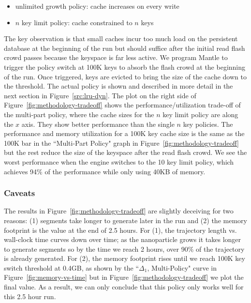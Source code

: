 \begin{itemize}
  \item unlimited growth policy: cache increases on every write
  \item \(n\) key limit policy: cache constrained to \(n\) keys
\end{itemize}

The key observation is that small caches incur too much load on the persistent
database at the beginning of the run but should suffice after the initial read
flash crowd passes because the keyspace is far less active.  We program Mantle
to trigger the policy switch at 100K keys to absorb the flash crowd at the
beginning of the run. Once triggered, keys are evicted to bring the size of the
cache down to the threshold.  The actual policy is shown and described in more
detail in the next section in Figure~\ref{src:lru-dyn}.  The plot on the right
side of Figure~\ref{fig:methodology-tradeoff} shows the performance/utilization
trade-off of the multi-part policy, where the cache sizes for the \(n\) key
limit policy are along the \(x\) axis.  They show better performance than the
single \(n\) key policies. The performance and memory utilization for a 100K
key cache size is the same as the 100K bar in the ``Multi-Part Policy" graph in
Figure~\ref{fig:methodology-tradeoff} but the rest reduce the size of the
keyspace after the read flash crowd.  We see the worst performance when the
engine switches to the 10 key limit policy, which achieves 94\% of the
performance while only using 40KB of memory. 

\subsubsection*{Caveats}

The results in Figure~\ref{fig:methodology-tradeoff} are slightly deceiving for
two reasons: (1) segments take longer to generate later in the run and (2) the
memory footprint is the value at the end of 2.5 hours.  For (1), the trajectory
length vs.  wall-clock time curves down over time; as the nanoparticle grows
it takes longer to generate segments so by the time we reach 2 hours, over 90\%
of the trajectory is already generated.  For (2), the memory footprint rises
until we reach 100K key switch threshold at 0.4GB, as shown by the
``\(\Delta_1\), Multi-Policy" curve in Figure~\ref{fig:memory-vs-time} but in
Figure~\ref{fig:methodology-tradeoff} we plot the final value. As a result, we
can only conclude that this policy only works well for this 2.5 hour run.


